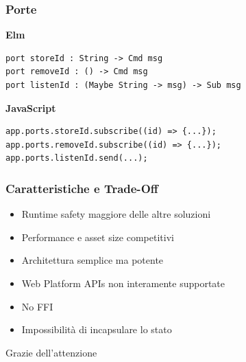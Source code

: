\documentclass{beamer}
\begin{document}
\begin{frame}[containsverbatim]
  \frametitle{Porte}
  \textbf{Elm}
  \begin{verbatim}
port storeId : String -> Cmd msg
port removeId : () -> Cmd msg
port listenId : (Maybe String -> msg) -> Sub msg
  \end{verbatim}
  \vspace{10pt}
  \textbf{JavaScript}
  \begin{verbatim}
app.ports.storeId.subscribe((id) => {...});
app.ports.removeId.subscribe((id) => {...});
app.ports.listenId.send(...);
  \end{verbatim}
\end{frame}

\begin{frame}
  \frametitle{Caratteristiche e Trade-Off}
  \begin{itemize}
    \item Runtime safety maggiore delle altre soluzioni
    \item Performance e asset size competitivi
    \item Architettura semplice ma potente
    \item Web Platform APIs non interamente supportate
    \item No FFI
    \item Impossibilità di incapsulare lo stato
  \end{itemize}
\end{frame}

\begin{frame}[plain]
  \vfill
  \centering
  \Huge Grazie dell'attenzione
  \vfill
\end{frame}
\end{document}
